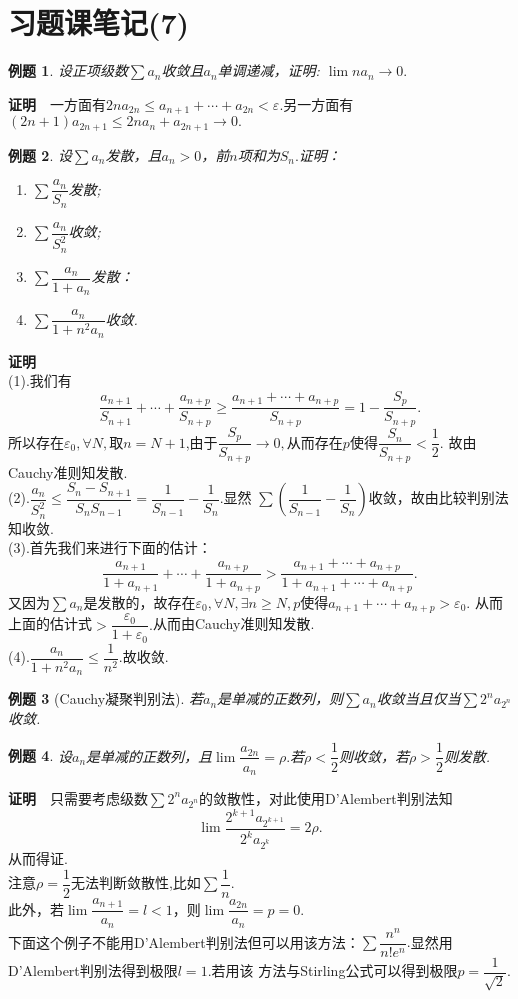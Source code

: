 \documentclass[UTF8]{article}
\newcommand{\zm}{\textbf{证明}$\quad$}
\newtheorem{exa}{\hspace{2em}例题}[section]
\begin{document}
\section{习题课笔记(7)}
\begin{exa}
  设正项级数$\sum a_n$收敛且$a_n$单调递减，证明: $\lim na_n\to0.$
\end{exa}
\zm 一方面有$2na_{2n}\le a_{n+1}+\cdots+a_{2n}<\varepsilon.$另一方面有
$(2n+1)a_{2n+1}\le 2na_n+a_{2n+1}\to0.$
\begin{exa}
  设$\sum a_n$发散，且$a_n>0$，前$n$项和为$S_n.$证明：
  \begin{enumerate}
    \item $\sum\dfrac{a_n}{S_n}$发散;
    \item $\sum\dfrac{a_n}{S^2_n}$收敛;
    \item $\sum\dfrac{a_n}{1+a_n}$发散：
    \item $\sum\dfrac{a_n}{1+n^2a_n}$收敛.
  \end{enumerate}
\end{exa}
\zm \\
(1).我们有
$$\frac{a_{n+1}}{S_{n+1}}+\cdots+\frac{a_{n+p}}{S_{n+p}}\ge\frac{a_{n+1}+\cdots+a_{n+p}}{S_{n+p}}
=1-\frac{S_p}{S_{n+p}}.$$
所以存在$\varepsilon_0,\forall N,$取$n=N+1$,由于$\dfrac{S_p}{S_{n+p}}\to0,$从而存在$p$使得$\dfrac{S_n}{S_{n+p}}<\dfrac{1}{2}.$
故由Cauchy准则知发散.\\
(2).$\dfrac{a_n}{S_n^2}\le\dfrac{S_n-S_{n+1}}{S_nS_{n-1}}=\dfrac{1}{S_{n-1}}-\dfrac{1}{S_n}$.显然
$\sum(\dfrac{1}{S_{n-1}}-\dfrac{1}{S_n})$收敛，故由比较判别法知收敛.\\
(3).首先我们来进行下面的估计：
$$\frac{a_{n+1}}{1+a_{n+1}}+\cdots+\frac{a_{n+p}}{1+a_{n+p}}>\frac{a_{n+1}+\cdots+a_{n+p}}{1+a_{n+1}+\cdots+a_{n+p}}.$$
又因为$\sum a_n$是发散的，故存在$\varepsilon_0,\forall N,\exists n\ge N,p$使得$a_{n+1}+\cdots+a_{n+p}>\varepsilon_0.$
从而上面的估计式$>\dfrac{\varepsilon_0}{1+\varepsilon_0}.$从而由Cauchy准则知发散.\\
(4).$\dfrac{a_n}{1+n^2a_n}\le\dfrac{1}{n^2}.$故收敛.
\begin{exa}[Cauchy凝聚判别法]
  若$a_n$是单减的正数列，则$\sum a_n$收敛当且仅当$\sum 2^na_{2^n}$收敛.
\end{exa}
\begin{exa}
  设$a_n$是单减的正数列，且$\lim\dfrac{a_{2n}}{a_n}=\rho.$若$\rho<\dfrac{1}{2}$则收敛，若$\rho>\dfrac{1}{2}$则发散.
\end{exa}
\zm 只需要考虑级数$\sum 2^na_{2^n}$的敛散性，对此使用D'Alembert判别法知
$$\lim\frac{2^{k+1}a_{2^{k+1}}}{2^ka_{2^k}}=2\rho.$$
从而得证.\\
注意$\rho=\dfrac{1}{2}$无法判断敛散性,比如$\sum\dfrac{1}{n}$.\\
此外，若$\lim\dfrac{a_{n+1}}{a_n}=l<1$，则$\lim\dfrac{a_{2n}}{a_n}=p=0$.\\
下面这个例子不能用D'Alembert判别法但可以用该方法：$\sum\dfrac{n^n}{n!e^n}.$显然用D'Alembert判别法得到极限$l=1.$若用该
方法与Stirling公式可以得到极限$p=\dfrac{1}{\sqrt{2}}.$
\clearpage
\end{document}
